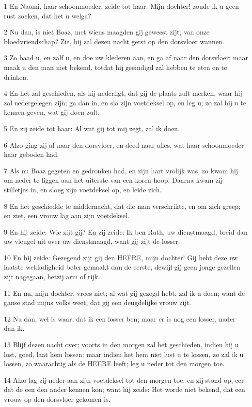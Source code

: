 \par 1 En Naomi, haar schoonmoeder, zeide tot haar: Mijn dochter! zoude ik u geen rust zoeken, dat het u welga?
\par 2 Nu dan, is niet Boaz, met wiens maagden gij geweest zijt, van onze bloedvriendschap? Zie, hij zal dezen nacht gerst op den dorsvloer wannen.
\par 3 Zo baad u, en zalf u, en doe uw klederen aan, en ga af naar den dorsvloer; maar maak u den man niet bekend, totdat hij geeindigd zal hebben te eten en te drinken.
\par 4 En het zal geschieden, als hij nederligt, dat gij de plaats zult merken, waar hij zal nedergelegen zijn; ga dan in, en sla zijn voetdeksel op, en leg u; zo zal hij u te kennen geven, wat gij doen zult.
\par 5 En zij zeide tot haar: Al wat gij tot mij zegt, zal ik doen.
\par 6 Alzo ging zij af naar den dorsvloer, en deed naar alles, wat haar schoonmoeder haar geboden had.
\par 7 Als nu Boaz gegeten en gedronken had, en zijn hart vrolijk was, zo kwam hij om neder te liggen aan het uiterste van een koren hoop. Daarna kwam zij stilletjes in, en sloeg zijn voetdeksel op, en leide zich.
\par 8 En het geschiedde te middernacht, dat die man verschrikte, en om zich greep; en ziet, een vrouw lag aan zijn voetdeksel.
\par 9 En hij zeide: Wie zijt gij? En zij zeide: Ik ben Ruth, uw dienstmaagd, breid dan uw vleugel uit over uw dienstmaagd, want gij zijt de losser.
\par 10 En hij zeide: Gezegend zijt gij den HEERE, mijn dochter! Gij hebt deze uw laatste weldadigheid beter gemaakt dan de eerste, dewijl gij geen jonge gezellen zijt nagegaan, hetzij arm of rijk.
\par 11 En nu, mijn dochter, vrees niet; al wat gij gezegd hebt, zal ik u doen; want de ganse stad mijns volks weet, dat gij een deugdelijke vrouw zijt.
\par 12 Nu dan, wel is waar, dat ik een losser ben; maar er is nog een losser, nader dan ik.
\par 13 Blijf dezen nacht over; voorts in den morgen zal het geschieden, indien hij u lost, goed, laat hem lossen; maar indien het hem niet lust u te lossen, zo zal ik u lossen, zo waarachtig als de HEERE leeft; leg u neder tot den morgen toe.
\par 14 Alzo lag zij neder aan zijn voetdeksel tot den morgen toe; en zij stond op, eer dat de een den ander kennen kon; want hij zeide: Het worde niet bekend, dat een vrouw op den dorsvloer gekomen is.
